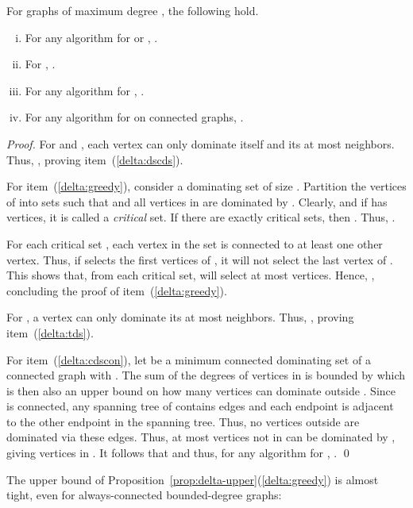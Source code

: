 \begin{proposition}
\label{prop:delta-upper}
For graphs of maximum degree , the following hold.
\begin{enumerate}[(i)]
\item \label{delta:dscds} For any algorithm \ALG for \ds or \cds, .
\item \label{delta:greedy} For \ds, .
\item \label{delta:tds} For any algorithm \ALG for \tds, .
\item \label{delta:cdscon} For any algorithm  for \cds on connected graphs, .
\end{enumerate}
\end{proposition}
\begin{proof}
For \ds and \cds, each vertex can only dominate itself and its at most 
neighbors. Thus, ,
proving item~(\ref{delta:dscds}).

For item~(\ref{delta:greedy}), consider a dominating set  of size .
Partition the vertices of  into  sets 
such that  and all vertices in 
are dominated by .
Clearly,  and 
if  has  vertices, it is called a {\em critical} set.
If there are exactly  critical sets, then
.
Thus, .

For each critical set , each vertex in the set is connected to at least
one other vertex.
Thus, if \greedy selects the  first vertices of , it will
not select the last vertex of .
This shows that, from each critical set, \greedy will select at most
 vertices.
Hence, , concluding the proof of
item~(\ref{delta:greedy}). 

For \tds, a vertex can only dominate its at most 
neighbors. Thus, , proving
item~(\ref{delta:tds}).

For item~(\ref{delta:cdscon}), let  be a minimum connected
dominating set of a connected graph  with .
The sum of the degrees of vertices in  is bounded by
 which is then also an upper bound on how many vertices
 can dominate outside .
Since  is connected, 
any spanning tree of  contains  edges
and each endpoint is adjacent to the other endpoint in the spanning tree.
Thus, no vertices outside  are dominated via these
edges.
Thus, at most 
 vertices not in  can be dominated by ,
giving  vertices in .
It follows that  and thus, for any
algorithm \ALG for \cds, .
\qed\end{proof}

The upper bound of
Proposition~\ref{prop:delta-upper}(\ref{delta:greedy}) is almost
tight, even for always-connected bounded-degree graphs:

